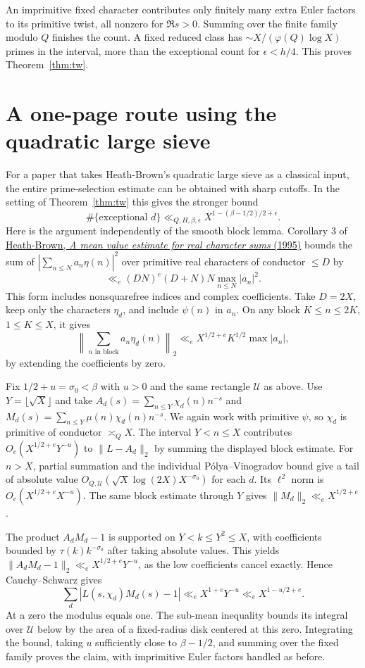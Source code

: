 \documentclass[11pt]{article}
\begin{document}
An imprimitive fixed character contributes only finitely many extra Euler factors to its primitive twist, all nonzero for $\Re s>0$. Summing over the finite family modulo $Q$ finishes the count. A fixed reduced class has $\sim X/(\varphi(Q)\log X)$ primes in the interval, more than the exceptional count for $\epsilon<h/4$. This proves Theorem~\ref{thm:tw}.

\newpage
\section{A one-page route using the quadratic large sieve}\label{sec:sieve}
For a paper that takes Heath-Brown's quadratic large sieve as a classical input, the entire prime-selection estimate can be obtained with sharp cutoffs. In the setting of Theorem~\ref{thm:tw} this gives the stronger bound
\[
 \#\{\text{exceptional }d\}\ll_{Q,H,\beta,\epsilon}
              X^{1-(\beta-1/2)/2+\epsilon}.
\]
Here is the argument independently of the smooth block lemma. Corollary 3 of \href{https://doi.org/10.4064/aa-72-3-235-275}{Heath-Brown, \emph{A mean value estimate for real character sums} (1995)} bounds the sum of $|\sum_{n\le N}a_n\eta(n)|^2$ over primitive real characters of conductor $\le D$ by
\[
 \ll_e (DN)^e (D+N)N\max_{n\le N}|a_n|^2 .
\]
This form includes nonsquarefree indices and complex coefficients. Take $D=2X$, keep only the characters $\eta_d$, and include $\psi(n)$ in $a_n$. On any block $K\le n\le 2K$, $1\le K\le X$, it gives
\[
 \left\|\sum_{n\text{ in block}} a_n\eta_d(n)\right\|_2
     \ll_e X^{1/2+e}K^{1/2}\max|a_n|,
\]
by extending the coefficients by zero.

Fix $1/2+u=\sigma_0<\beta$ with $u>0$ and the same rectangle $\mathcal U$ as above. Use $Y=\lfloor\sqrt X\rfloor$ and take $A_d(s)=\sum_{n\le Y}\chi_d(n)n^{-s}$ and $M_d(s)=\sum_{n\le Y}\mu(n)\chi_d(n)n^{-s}$. We again work with primitive $\psi$, so $\chi_d$ is primitive of conductor $\asymp_Q X$. The interval $Y<n\le X$ contributes $O_e(X^{1/2+e}Y^{-u})$ to $\|L-A_d\|_2$ by summing the displayed block estimate. For $n>X$, partial summation and the individual P\'olya--Vinogradov bound give a tail of absolute value $O_{Q,\mathcal U}(\sqrt X\log(2X) X^{-\sigma_0})$ for each $d$. Its $\ell^2$ norm is $O_e(X^{1/2+e}X^{-u})$. The same block estimate through $Y$ gives $\|M_d\|_2\ll_e X^{1/2+e}$.

The product $A_dM_d-1$ is supported on $Y<k\le Y^2\le X$, with coefficients bounded by $\tau(k)k^{-\sigma_0}$ after taking absolute values. This yields $\|A_dM_d-1\|_2\ll_e X^{1/2+e}Y^{-u}$, as the low coefficients cancel exactly. Hence Cauchy--Schwarz gives
\[
 \sum_d|L(s,\chi_d)M_d(s)-1|\ll_e X^{1+e}Y^{-u}
       \ll_e X^{1-u/2+e}.
\]
At a zero the modulus equals one. The sub-mean inequality bounds its integral over $\mathcal U$ below by the area of a fixed-radius disk centered at this zero. Integrating the bound, taking $u$ sufficiently close to $\beta-1/2$, and summing over the fixed family proves the claim, with imprimitive Euler factors handled as before.
\end{document}
